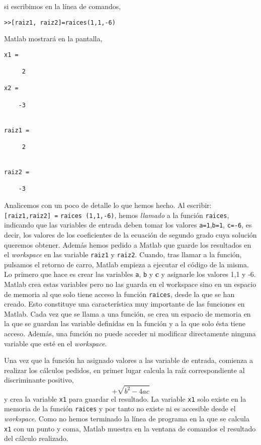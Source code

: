 si escribimos en la línea de comandos,
\begin{verbatim}
>>[raiz1, raiz2]=raices(1,1,-6)
\end{verbatim}
Matlab mostrará en la pantalla,

\begin{verbatim}
x1 =

     2
     
x2 =

    -3


raiz1 =

     2


raiz2 =

    -3

\end{verbatim}

Analicemos con un poco de detalle lo que hemos hecho. Al escribir: \texttt{[raiz1,raiz2] =} \texttt{raices (1,1,-6)}, hemos \emph{llamado} a la función \texttt{raices}, indicando que las variables de entrada deben tomar los valores \texttt{a=1},\texttt{b=1}, \texttt{c=-6}, es decir, los valores de los coeficientes de la ecuación de segundo grado cuya solución queremos obtener. Además hemos pedido a Matlab que guarde los resultados en el \emph{workspace} en las variable \texttt{raiz1} y \texttt{raiz2}. Cuando, tras llamar a la función, pulsamos el retorno de carro, Matlab empieza a ejecutar el código de la misma. Lo primero que hace es crear las variables \texttt{a}, \texttt{b} y \textbf{c} y asignarle los valores 1,1 y -6. Matlab crea estas variables pero no las guarda en el workspace sino en un espacio de memoria al que solo tiene acceso la función \texttt{raices}, desde la que se han creado. 
Esto constituye una característica muy importante de las funciones en Matlab. Cada vez que se llama a una función, se crea un espacio de memoria en la que se guardan las variable definidas en la función y a la que solo ésta tiene acceso. Además, una función no puede acceder ni modificar directamente ninguna variable que esté en el \emph{workspace}.

Una vez que la función ha asignado valores a las variable de entrada, comienza a realizar los cálculos pedidos, en primer lugar calcula la raíz correspondiente al discriminante positivo,
\begin{equation*}
+\sqrt{b^2-4ac}
\end{equation*}
y crea la variable \texttt{x1} para guardar el resultado. La variable \texttt{x1} solo existe en la memoria de la función \texttt{raices} y por tanto no existe ni es accesible desde el \emph{workspace}. Como no hemos terminado la línea de programa en la que se calcula \texttt{x1} con un punto y coma, Matlab muestra en la ventana de comandos el resultado del cálculo realizado. 

